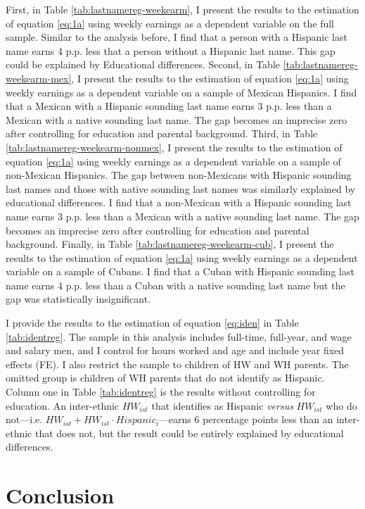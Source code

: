 \documentclass[12pt,english]{article}
\begin{document}
First, in Table \ref{tab:lastnamereg-weekearm}, I present the results to the estimation of equation \ref{eq:1a} using weekly earnings as a dependent variable on the full sample. Similar to the analysis before, I find that a person with a Hispanic last name earns 4 p.p. less that a person without a Hispanic last name. This gap could be explained by Educational differences. Second, in Table \ref{tab:lastnamereg-weekearm-mex}, I present the results to the estimation of equation \ref{eq:1a} using weekly earnings as a dependent variable on a sample of Mexican Hispanics. I find that a Mexican with a Hispanic sounding last name earns 3 p.p. less than a Mexican with a native sounding last name. The gap becomes an imprecise zero after controlling for education and parental background. Third, in Table \ref{tab:lastnamereg-weekearm-nonmex}, I present the results to the estimation of equation \ref{eq:1a} using weekly earnings as a dependent variable on a sample of non-Mexican Hispanics. The gap between non-Mexicans with Hispanic sounding last names and those with native sounding last names was similarly explained by educational differences. I find that a non-Mexican with a Hispanic sounding last name earns 3 p.p. less than a Mexican with a native sounding last name. The gap becomes an imprecise zero after controlling for education and parental background. Finally, in Table \ref{tab:lastnamereg-weekearm-cub}, I present the results to the estimation of equation \ref{eq:1a} using weekly earnings as a dependent variable on a sample of Cubans. I find that a Cuban with Hispanic sounding last name earns 4 p.p. less than a Cuban with a native sounding last name but the gap was statistically insignificant.

I provide the results to the estimation of equation \ref{eq:iden} in Table \ref{tab:identreg}. The sample in this analysis includes full-time, full-year, and wage and salary men, and I control for hours worked and age and include year fixed effects (FE). I also restrict the sample to children of HW and WH parents. The omitted group is children of WH parents that do not identify as Hispanic. Column one in Table \ref{tab:identreg} is the results without controlling for education. An inter-ethnic $HW_{ist}$ that identifies as Hispanic \textit{versus} $HW_{ist}$ who do not---i.e. $HW_{ist} + HW_{ist} \cdot Hispanic_i$---earns 6 percentage points less than an inter-ethnic that does not, but the result could be entirely explained by educational differences.

\section{Conclusion}\label{sec:con1}
\end{document}
